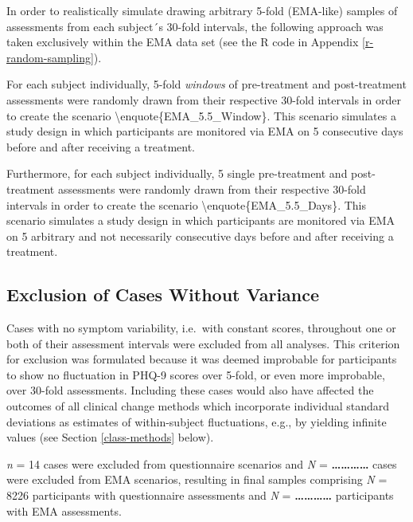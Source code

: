 \documentclass[12pt,twoside]{reedthesis}
\begin{document}
In order to realistically simulate drawing arbitrary 5-fold (EMA-like) samples of assessments from each subject´s 30-fold intervals, the following approach was taken exclusively within the EMA data set (see the R code in Appendix \ref{r-random-sampling}).

\par

For each subject individually, 5-fold \emph{windows} of pre-treatment and post-treatment assessments were randomly drawn from their respective 30-fold intervals in order to create the scenario \textbackslash enquote\{EMA\_5.5\_Window\}. This scenario simulates a study design in which participants are monitored via EMA on 5 consecutive days before and after receiving a treatment.

\par

Furthermore, for each subject individually, 5 single pre-treatment and post-treatment assessments were randomly drawn from their respective 30-fold intervals in order to create the scenario \textbackslash enquote\{EMA\_5.5\_Days\}. This scenario simulates a study design in which participants are monitored via EMA on 5 arbitrary and not necessarily consecutive days before and after receiving a treatment.

\hypertarget{exclusion-of-cases-without-variance}{%
\subsection{Exclusion of Cases Without Variance}\label{exclusion-of-cases-without-variance}}

Cases with no symptom variability, i.e.~with constant scores, throughout one or both of their assessment intervals were excluded from all analyses. This criterion for exclusion was formulated because it was deemed improbable for participants to show no fluctuation in PHQ-9 scores over 5-fold, or even more improbable, over 30-fold assessments. Including these cases would also have affected the outcomes of all clinical change methods which incorporate individual standard deviations as estimates of within-subject fluctuations, e.g., by yielding infinite values (see Section \ref{class-methods} below).

\par

\emph{n} = 14 cases were excluded from questionnaire scenarios and \emph{N} = \textbf{\ldots\ldots\ldots\ldots{}} cases were excluded from EMA scenarios, resulting in final samples comprising \emph{N} = 8226 participants with questionnaire assessments and \emph{N} = \textbf{\ldots\ldots\ldots\ldots{}} participants with EMA assessments.
\end{document}
